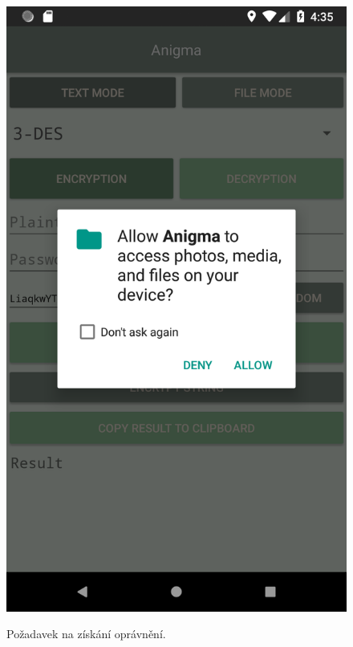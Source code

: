 \documentclass[12pt, a4paper]{article}
\begin{document}
\begin{figure}[h]
\caption{Požadavek na získání oprávnění.}
\centering
\includegraphics[height=0.4\textheight]{opravneni}
\label{fig:perm}
\end{figure}
\end{document}
